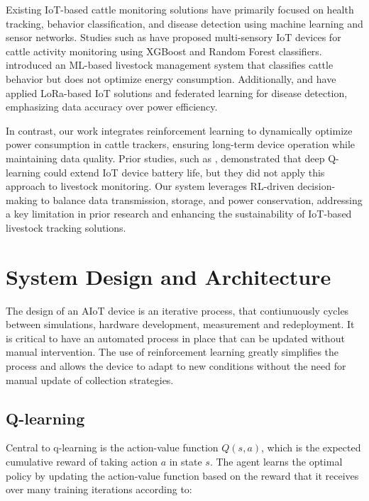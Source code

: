 \documentclass[10pt]{cai}
\begin{document}
Existing IoT-based cattle monitoring solutions have primarily focused on health tracking, behavior classification, and disease detection using machine learning and sensor networks. 
Studies such as \cite{duttaMOOnitorIoTBased2022} have proposed multi-sensory IoT devices for cattle activity monitoring using XGBoost and Random Forest classifiers. 
\cite{yamsaniIoTBasedLivestockMonitoring2024} introduced an ML-based livestock management system that classifies cattle behavior but does not optimize energy consumption. 
Additionally, \cite{arshadFederatedLearningModel2024} and \cite{iRealTimeCattle2024} have applied LoRa-based IoT solutions and federated learning for disease detection, emphasizing data accuracy over power efficiency.

In contrast, our work integrates reinforcement learning to dynamically optimize power consumption in cattle trackers, ensuring long-term device operation while maintaining data quality. 
Prior studies, such as \cite{hribarUsingDeepQLearning2019}, demonstrated that deep Q-learning could extend IoT device battery life, but they did not apply this approach to livestock monitoring. 
Our system leverages RL-driven decision-making to balance data transmission, storage, and power conservation, addressing a key limitation in prior research and enhancing the sustainability of IoT-based livestock tracking solutions.


\section{System Design and Architecture}

The design of an AIoT device is an iterative process, that contiunuously cycles between simulations, hardware development, measurement and redeployment.
It is critical to have an automated process in place that can be updated without manual intervention.
The use of reinforcement learning greatly simplifies the process and allows the device to adapt to new conditions without the need for manual update of collection strategies.

\subsection{Q-learning}

Central to q-learning is the action-value function $Q(s,a)$, which is the expected cumulative reward of taking action $a$ in state $s$.
The agent learns the optimal policy by updating the action-value function based on the reward that it receives over many training iterations according to:
\end{document}
